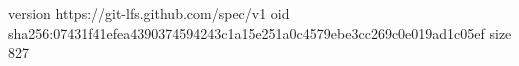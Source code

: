 version https://git-lfs.github.com/spec/v1
oid sha256:07431f41efea4390374594243c1a15e251a0c4579ebe3cc269c0e019ad1c05ef
size 827
